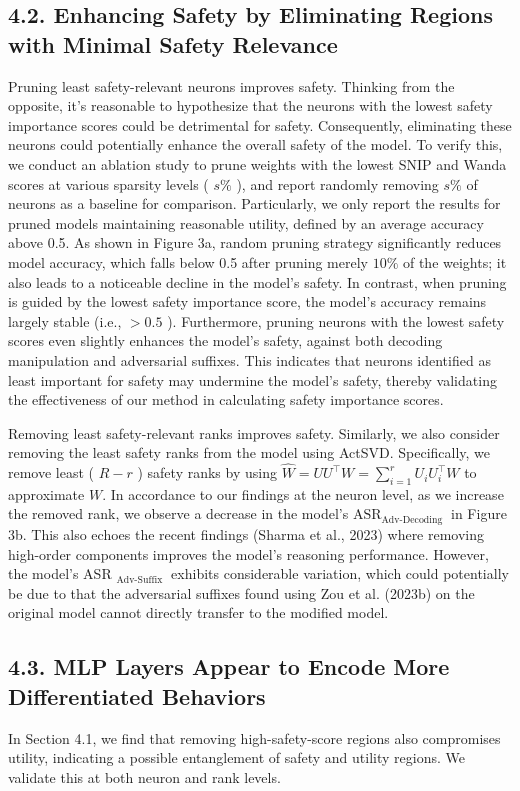 \documentclass[10pt]{article}
\begin{document}
\subsection*{4.2. Enhancing Safety by Eliminating Regions with Minimal Safety Relevance}
Pruning least safety-relevant neurons improves safety. Thinking from the opposite, it's reasonable to hypothesize that the neurons with the lowest safety importance scores could be detrimental for safety. Consequently, eliminating these neurons could potentially enhance the overall safety of the model. To verify this, we conduct an ablation study to prune weights with the lowest SNIP and Wanda scores at various sparsity levels ( $s \%$ ), and report randomly removing $s \%$ of neurons as a baseline for comparison. Particularly, we only report the results for pruned models maintaining reasonable utility, defined by an average accuracy above 0.5. As shown in Figure 3a, random pruning strategy significantly reduces model accuracy, which falls below 0.5 after pruning merely $10 \%$ of the weights; it also leads to a noticeable decline in the model's safety. In contrast, when pruning\\
is guided by the lowest safety importance score, the model's accuracy remains largely stable (i.e., $>0.5$ ). Furthermore, pruning neurons with the lowest safety scores even slightly enhances the model's safety, against both decoding manipulation and adversarial suffixes. This indicates that neurons identified as least important for safety may undermine the model's safety, thereby validating the effectiveness of our method in calculating safety importance scores.

Removing least safety-relevant ranks improves safety. Similarly, we also consider removing the least safety ranks from the model using ActSVD. Specifically, we remove least ( $R-r$ ) safety ranks by using $\widehat{W}=U U^{\top} W= \sum_{i=1}^{r} U_{i} U_{i}^{\top} W$ to approximate $W$. In accordance to our findings at the neuron level, as we increase the removed rank, we observe a decrease in the model's $\mathrm{ASR}_{\text {Adv-Decoding }}$ in Figure 3b. This also echoes the recent findings (Sharma et al., 2023) where removing high-order components improves the model's reasoning performance. However, the model's ASR $_{\text {Adv-Suffix }}$ exhibits considerable variation, which could potentially be due to that the adversarial suffixes found using Zou et al. (2023b) on the original model cannot directly transfer to the modified model.

\subsection*{4.3. MLP Layers Appear to Encode More Differentiated Behaviors}
In Section 4.1, we find that removing high-safety-score regions also compromises utility, indicating a possible entanglement of safety and utility regions. We validate this at both neuron and rank levels.
\end{document}
